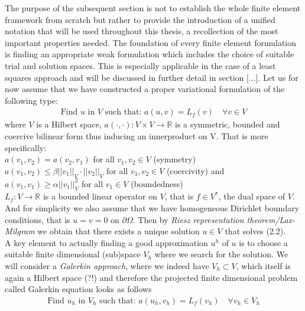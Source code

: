 \documentclass[fleqn, a4paper, 11pt, bibliography=totoc]{report}
\begin{document}
The purpose of the subsequent section is not to establish the whole finite element framework from scratch but rather to provide the introduction of a unified notation that will be used throughout this thesis, a recollection of the most important properties needed. The foundation of every finite element formulation is finding an appropriate weak formulation which includes the choice of suitable trial and solution spaces. This is especially applicable in the case of a least squares approach and will be discussed in further detail in section [...]. Let us for now assume that we have constructed a proper variational formulation of the following type:
\begin{equation}
\begin{aligned}
\text{Find } u \text{ in } V \text{ such that:  } a(u, v) = L_f(v) \quad \forall v \in V
\end{aligned}
\end{equation}
where $V$ is a Hilbert space, $a(\cdot, \cdot): V \times V \rightarrow \mathbb{R}$ is a symmetric, bounded and coercive bilinear form thus inducing an innerproduct on V. That is more specifically:
\bigskip
\\
$a(v_1, v_2) = a(v_2, v_1)$ for all  $v_1, v_2 \in V$ (symmetry) \\
$a(v_1, v_2) \leq \beta ||v_1||_V \cdot ||v_2||_V $ for all $v_1, v_2 \in V$ (coercivity) and \\ $a(v_1, v_1) \geq \alpha ||v_1||_V^2$ for all $v_1 \in V$ (boundedness)
\bigskip
\\
$L_f : V \rightarrow \mathbb{R}$ is a bounded linear operator on $V$, that is $f \in V^*$, the dual space of $V$. And for simplicity we also assume that we have homogeneous Dirichlet boundary conditions, that is $u = v = 0$ on $\partial \Omega$. Then by \textit{Riesz representation theorem/Lax-Milgram} we obtain that there exists a unique solution $u \in V$ that solves (2.2). \\
A key element to actually finding a good approximation $u^h$ of $u$ is to choose a suitable finite dimensional (sub)space $V_h$ where we search for the solution. We will consider a \textit{Galerkin approach}, where we indeed have $V_h \subset V$, which itself is again a Hilbert space (?!) and therefore the projected finite dimensional problem called Galerkin equation looks as follows
\begin{equation}
\begin{aligned}
\text{Find } u_h \text{ in } V_h \text{ such that:  } a(u_h, v_h) = L_f(v_h) \quad \forall v_h \in V_h
\end{aligned}
\end{equation}
\end{document}
